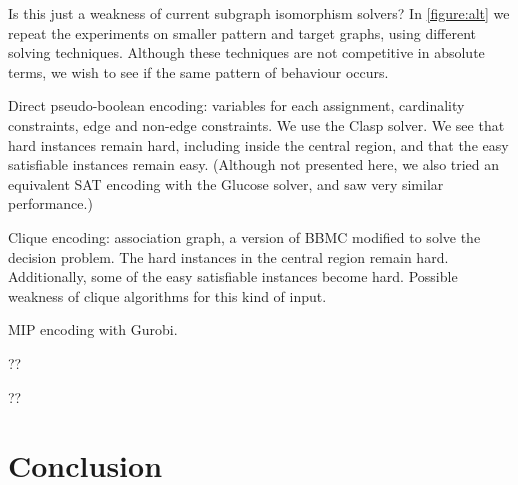 \documentclass[letterpaper]{article}
\begin{document}
\begin{figure*}[t]
    
    \caption{Behaviour of other solvers on the induced variant on smaller graphs, shown in the style of
        \cref{figure:non-induced}. The second row shows the number of search nodes used by the Glasgow
        algorithm, the third row shows the number of decisions made by the Clasp pseudo-boolean solver,
        the fourth row shows the number of search nodes used by a clique encoding, and the fifth a mixed
        integer encoding with Gurobi.}\label{figure:alt}
\end{figure*}

Is this just a weakness of current subgraph isomorphism solvers? In \cref{figure:alt} we repeat the
experiments on smaller pattern and target graphs, using different solving techniques. Although these
techniques are not competitive in absolute terms, we wish to see if the same pattern of behaviour
occurs.

Direct pseudo-boolean encoding: variables for each assignment, cardinality constraints, edge and
non-edge constraints. We use the Clasp solver. We see that hard instances remain hard, including
inside the central region, and that the easy satisfiable instances remain easy. (Although not
presented here, we also tried an equivalent SAT encoding with the Glucose solver, and saw very
similar performance.)

Clique encoding: association graph, a version of BBMC modified to solve the decision problem. The
hard instances in the central region remain hard. Additionally, some of the easy satisfiable
instances become hard. Possible weakness of clique algorithms for this kind of input.

MIP encoding with Gurobi.

?? \citep{Anton:2009}

?? \citep{Lipets:2009}

\section{Conclusion}



\end{document}
